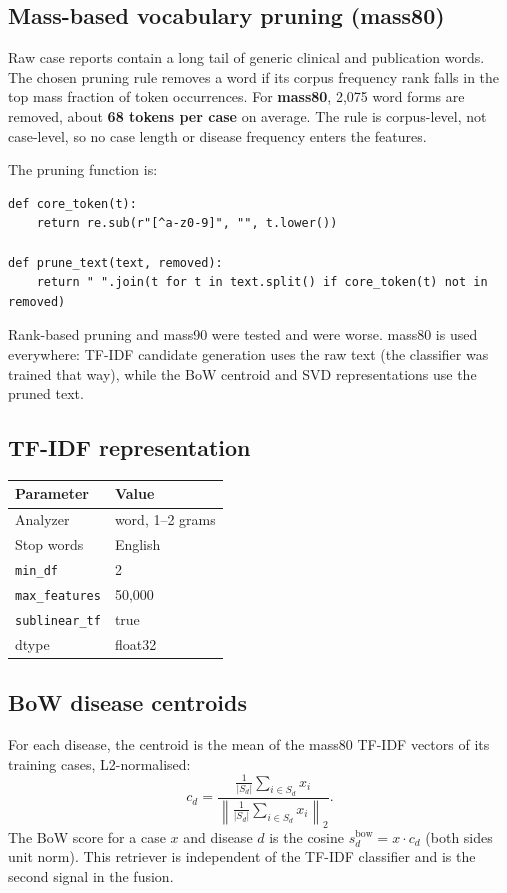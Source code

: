 \documentclass[11pt,a4paper]{article}
\newcommand{\code}[1]{\texttt{\small #1}}
\begin{document}
\subsection{Mass-based vocabulary pruning (mass80)}

Raw case reports contain a long tail of generic clinical and publication words.
The chosen pruning rule removes a word if its corpus frequency rank falls in the
top mass fraction of token occurrences. For \textbf{mass80}, 2,075 word forms are
removed, about \textbf{68 tokens per case} on average. The rule is corpus-level,
not case-level, so no case length or disease frequency enters the features.

The pruning function is:
\begin{lstlisting}
def core_token(t):
    return re.sub(r"[^a-z0-9]", "", t.lower())

def prune_text(text, removed):
    return " ".join(t for t in text.split() if core_token(t) not in removed)
\end{lstlisting}

Rank-based pruning and mass90 were tested and were worse. mass80 is used everywhere:
TF-IDF candidate generation uses the raw text (the classifier was trained that way),
while the BoW centroid and SVD representations use the pruned text.

\subsection{TF-IDF representation}

\begin{center}
\begin{tabular}{ll}
\toprule
Parameter & Value\\
\midrule
Analyzer & word, 1--2 grams\\
Stop words & English\\
\code{min\_df} & 2\\
\code{max\_features} & 50,000\\
\code{sublinear\_tf} & true\\
dtype & float32\\
\bottomrule
\end{tabular}
\end{center}

\subsection{BoW disease centroids}

For each disease, the centroid is the mean of the mass80 TF-IDF vectors of its
training cases, L2-normalised:
\begin{equation}
c_d = \frac{\frac{1}{|S_d|}\sum_{i\in S_d} x_i}{\left\|\frac{1}{|S_d|}\sum_{i\in S_d} x_i\right\|_2}.
\end{equation}
The BoW score for a case $x$ and disease $d$ is the cosine
$s^{\mathrm{bow}}_d = x\cdot c_d$ (both sides unit norm).
This retriever is independent of the TF-IDF classifier and is the second signal
in the fusion.
\end{document}
